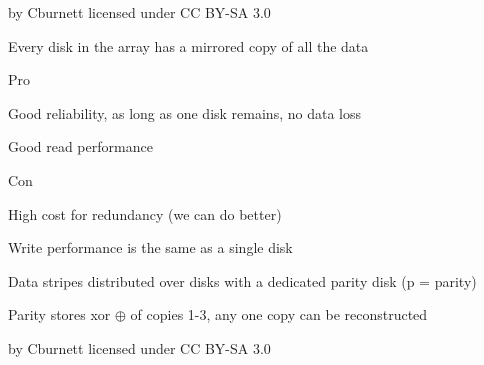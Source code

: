\begin{slide}
  

  \begin{center}
    
  \end{center}

  \begin{flushright}
    by Cburnett licensed under CC BY-SA 3.0
  \end{flushright}
\end{slide}

\begin{slide}
  

  Every disk in the array has a mirrored copy of all the data
  \medskip

  Pro

  \leftspace{}Good reliability, as long as one disk remains, no data loss

  \leftspace{}Good read performance
  \medskip

  Con

  \leftspace{}High cost for redundancy (we can do better)

  \leftspace{}Write performance is the same as a single disk

\end{slide}

\begin{slide}
  

  Data stripes distributed over disks with a dedicated parity disk (p = parity)

  \leftspace{}Parity stores xor $\oplus$ of copies 1-3, any one copy can be
               reconstructed

  \begin{center}
    
  \end{center}

  \begin{flushright}
    by Cburnett licensed under CC BY-SA 3.0
  \end{flushright}

\end{slide}

